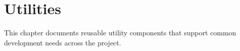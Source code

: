 \chapter{Utilities}
\label{chap:utilities}

This chapter documents reusable utility components that support common development needs across the project.

